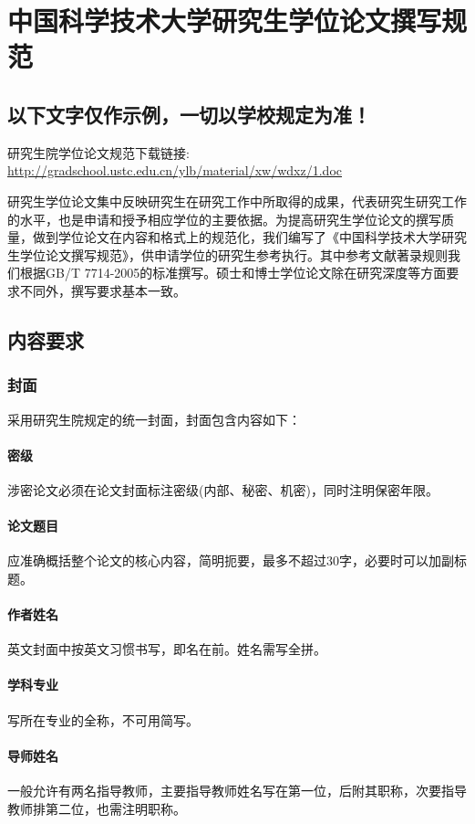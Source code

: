 ﻿\chapter{中国科学技术大学研究生学位论文撰写规范}
\label{chap:requires}
\section*{以下文字仅作示例，一切以学校规定为准！}
研究生院学位论文规范下载链接:\\
\url{http://gradschool.ustc.edu.cn/ylb/material/xw/wdxz/1.doc}

\bigskip

研究生学位论文集中反映研究生在研究工作中所取得的成果，代表研究生研究工作的水平，也是申请和授予相应学位的主要依据。为提高研究生学位论文的撰写质量，做到学位论文在内容和格式上的规范化，我们编写了《中国科学技术大学研究生学位论文撰写规范》，供申请学位的研究生参考执行。其中参考文献著录规则我们根据GB/T 7714-2005的标准撰写。硕士和博士学位论文除在研究深度等方面要求不同外，撰写要求基本一致。

\section{内容要求}

\subsection{封面}
采用研究生院规定的统一封面，封面包含内容如下：
\subsubsection{密级} 涉密论文必须在论文封面标注密级(内部、秘密、机密)，同时注明保密年限。
\subsubsection{论文题目} 应准确概括整个论文的核心内容，简明扼要，最多不超过30字，必要时可以加副标题。
\subsubsection{作者姓名} 英文封面中按英文习惯书写，即名在前。姓名需写全拼。
\subsubsection{学科专业} 写所在专业的全称，不可用简写。
\subsubsection{导师姓名} 一般允许有两名指导教师，主要指导教师姓名写在第一位，后附其职称，次要指导教师排第二位，也需注明职称。
